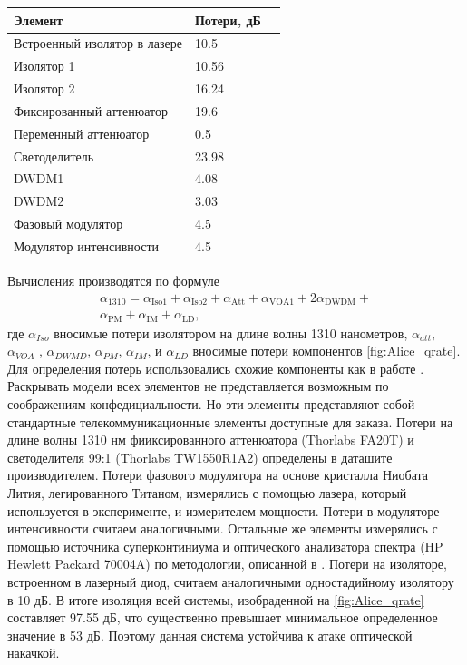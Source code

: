 \begin{tabular}[t]{lll}
    \hline\hline
    Элемент & Потери, дБ  \\
    \hline
    Встроенный изолятор в лазере &10.5 \\
    Изолятор 1  & 10.56 &  \\
    Изолятор  2 & 16.24 &  \\
    Фиксированный аттенюатор & 19.6  \\
    Переменный аттенюатор & 0.5 \\
    Светоделитель & 23.98 \\
    DWDM1  & 4.08  \\
    DWDM2  & 3.03  \\
    Фазовый модулятор & 4.5  \\
    Модулятор интенсивности & 4.5 \\
    \hline\hline
    \end{tabular}
      \label{tab:isolation1310}
Вычисления производятся по формуле 
\begin{equation}
    \begin{split}
    \alpha_{1310}=\alpha_\text{Iso1} + \alpha_\text{Iso2} + \alpha_\text{Att} + \alpha_\text{VOA1} + 2\alpha_\text{DWDM} +\\
     \alpha_\text{PM} + \alpha_\text{IM} + \alpha_\text{LD},
     \end{split}
    \label{eq:input power}
\end{equation}
где $\alpha_{Iso}$ вносимые потери изолятором на длине волны 1310 нанометров, $\alpha_{att}$, $\alpha_{VOA}$ , $\alpha_{DWMD}$, $\alpha_{PM}$, $\alpha_{IM}$, и $\alpha_{LD}$ вносимые потери компонентов \ref{fig:Alice_qrate}.
Для определения потерь использовались схожие компоненты как в работе \cite{makarov2023}. Раскрывать модели всех элементов не представляется возможным по соображениям конфедициальности. 
Но эти элементы представляют собой стандартные телекоммуникационные элементы доступные для заказа. Потери на длине волны 1310 нм фииксированного аттенюатора (Thorlabs FA20T) и светоделителя 99:1 (Thorlabs TW1550R1A2) определены в даташите производителем.
Потери фазового модулятора на основе кристалла Ниобата Лития, легированного Титаном, измерялись с помощью лазера, который используется в эксперименте, и измерителем мощности. Потери в модуляторе интенсивности считаем аналогичными.
Остальные же элементы измерялись с помощью источника суперконтиниума и оптического анализатора спектра (HP Hewlett Packard 70004A) по методологии, описанной в \cite{makarov2023}. Потери на изоляторе, встроенном в лазерный диод, считаем аналогичными одностадийному изолятору в 10 дБ.
В итоге изоляция всей системы, изобраденной на \cref{fig:Alice_qrate} составляет 97.55 дБ, что существенно превышает минимальное определенное значение в 53 дБ. Поэтому данная система устойчива к атаке оптической накачкой. 

